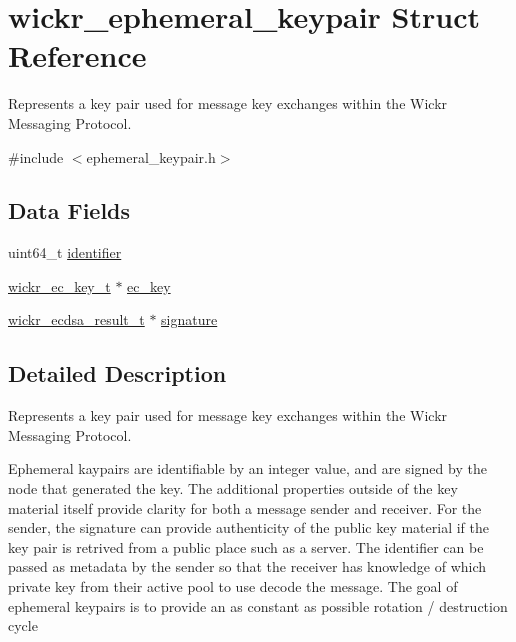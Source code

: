\hypertarget{structwickr__ephemeral__keypair}{}\section{wickr\+\_\+ephemeral\+\_\+keypair Struct Reference}
\label{structwickr__ephemeral__keypair}


Represents a key pair used for message key exchanges within the Wickr Messaging Protocol.  




{\ttfamily \#include $<$ephemeral\+\_\+keypair.\+h$>$}

\subsection*{Data Fields}
\begin{DoxyCompactItemize}
\item 
uint64\+\_\+t \hyperlink{structwickr__ephemeral__keypair_a9220b37a7db764818406bcc84e3ba86b}{identifier}
\item 
\hyperlink{structwickr__ec__key}{wickr\+\_\+ec\+\_\+key\+\_\+t} $\ast$ \hyperlink{structwickr__ephemeral__keypair_ad730ed9ba92e05d0a271edc838e548fe}{ec\+\_\+key}
\item 
\hyperlink{structwickr__ecdsa__result}{wickr\+\_\+ecdsa\+\_\+result\+\_\+t} $\ast$ \hyperlink{structwickr__ephemeral__keypair_aea420be2397d798a560fa973be86228c}{signature}
\end{DoxyCompactItemize}


\subsection{Detailed Description}
Represents a key pair used for message key exchanges within the Wickr Messaging Protocol. 

Ephemeral kaypairs are identifiable by an integer value, and are signed by the node that generated the key. The additional properties outside of the key material itself provide clarity for both a message sender and receiver. For the sender, the signature can provide authenticity of the public key material if the key pair is retrived from a public place such as a server. The identifier can be passed as metadata by the sender so that the receiver has knowledge of which private key from their active pool to use decode the message. The goal of ephemeral keypairs is to provide an as constant as possible rotation / destruction cycle 

